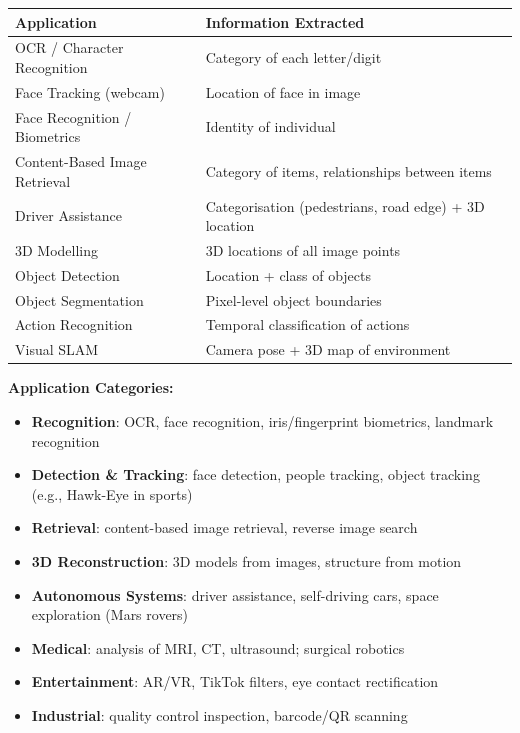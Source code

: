 \begin{center}
\renewcommand{\arraystretch}{1.3}
\begin{tabular}{@{} p{4.5cm} p{8cm} @{}}
\toprule
\textbf{Application} & \textbf{Information Extracted} \\
\midrule
OCR / Character Recognition & Category of each letter/digit \\
Face Tracking (webcam) & Location of face in image \\
Face Recognition / Biometrics & Identity of individual \\
Content-Based Image Retrieval & Category of items, relationships between items \\
Driver Assistance & Categorisation (pedestrians, road edge) + 3D location \\
3D Modelling & 3D locations of all image points \\
Object Detection & Location + class of objects \\
Object Segmentation & Pixel-level object boundaries \\
Action Recognition & Temporal classification of actions \\
Visual SLAM & Camera pose + 3D map of environment \\
\bottomrule
\end{tabular}
\end{center}

\separator

\textbf{Application Categories:}
\begin{itemize}
  \item \textbf{Recognition}: OCR, face recognition, iris/fingerprint biometrics, landmark recognition
  \item \textbf{Detection \& Tracking}: face detection, people tracking, object tracking (e.g., Hawk-Eye in sports)
  \item \textbf{Retrieval}: content-based image retrieval, reverse image search
  \item \textbf{3D Reconstruction}: 3D models from images, structure from motion
  \item \textbf{Autonomous Systems}: driver assistance, self-driving cars, space exploration (Mars rovers)
  \item \textbf{Medical}: analysis of MRI, CT, ultrasound; surgical robotics
  \item \textbf{Entertainment}: AR/VR, TikTok filters, eye contact rectification
  \item \textbf{Industrial}: quality control inspection, barcode/QR scanning
\end{itemize}

